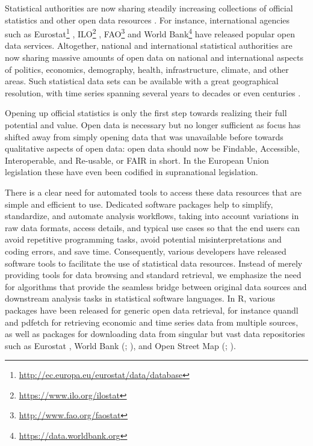 
Statistical authorities are now sharing steadily increasing
collections of official statistics and other open data
resources \cite{xxx}. For instance, international agencies such as
Eurostat\footnote{\url{http://ec.europa.eu/eurostat/data/database}} \cite{xxx},
ILO\footnote{\url{https://www.ilo.org/ilostat}} \cite{xxx} ,
FAO\footnote{\url{http://www.fao.org/faostat}} \cite{xxx} and World
Bank\footnote{\url{https://data.worldbank.org}} \cite{xxx} have
released popular open data services. Altogether, national and
international statistical authorities are now sharing massive amounts
of open data on national and international aspects of politics,
economics, demography, health, infrastructure, climate, and other
areas. Such statistical data sets can be available with a great
geographical resolution, with time series spanning several years to
decades or even centuries \cite{xxx}.


Opening up official statistics is only the first step towards realizing their full potential and value. Open data is necessary but no longer sufficient as focus has shifted away from simply opening data that was unavailable before towards qualitative aspects of open data: open data should now be Findable, Accessible, Interoperable, and Re-usable, or FAIR in short. In the European Union legislation these have even been codified in supranational legislation.

There is a clear
need for automated tools to access these data resources that are
simple and efficient to use. Dedicated software packages help to
simplify, standardize, and automate analysis workflows, taking into
account variations in raw data formats, access details, and typical
use cases so that the end users can avoid repetitive programming
tasks, avoid potential misinterpretations and coding errors, and save
time. Consequently, various developers have released software tools to
facilitate the use of statistical data resources. Instead of merely
providing tools for data browsing and standard retrieval, we emphasize
the need for algorithms that provide the seamless bridge between
original data sources and downstream analysis tasks in statistical
software languages. In R, various packages have been released
for generic open data retrieval, for instance
quandl \cite{quandl} and pdfetch \cite{pdfetch} for retrieving economic and time series data from multiple sources, as well as packages for downloading data from singular but vast data repositories such as
Eurostat \cite{Lahti17eurostat}, World Bank
(; \citealt{WDI}), and Open Street Map
(; \citealt{osmar}).


